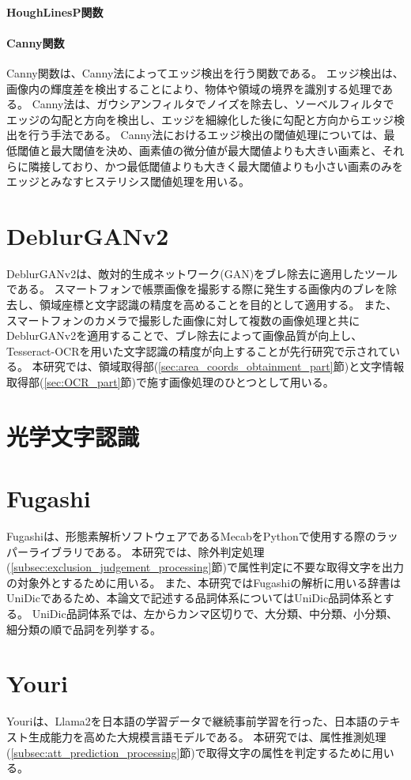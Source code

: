 \paragraph{HoughLinesP関数}

\paragraph{Canny関数}
Canny関数は、Canny法によってエッジ検出を行う関数である。
エッジ検出は、画像内の輝度差を検出することにより、物体や領域の境界を識別する処理である\cite{エッジ検出}。
Canny法は、ガウシアンフィルタでノイズを除去し、ソーベルフィルタでエッジの勾配と方向を検出し、エッジを細線化した後に勾配と方向からエッジ検出を行う手法である。
Canny法におけるエッジ検出の閾値処理については、最低閾値と最大閾値を決め、画素値の微分値が最大閾値よりも大きい画素と、それらに隣接しており、かつ最低閾値よりも大きく最大閾値よりも小さい画素のみをエッジとみなすヒステリシス閾値処理を用いる。


\section{DeblurGANv2}\label{sec:Deblur-GANv2}
DeblurGANv2は、敵対的生成ネットワーク(GAN)をブレ除去に適用したツールである\cite{DeblurGANv2}。
スマートフォンで帳票画像を撮影する際に発生する画像内のブレを除去し、領域座標と文字認識の精度を高めることを目的として適用する。
また、スマートフォンのカメラで撮影した画像に対して複数の画像処理と共にDeblurGANv2を適用することで、ブレ除去によって画像品質が向上し、Tesseract-OCRを用いた文字認識の精度が向上することが先行研究で示されている\cite{DeblurGANv2の先行研究}。
本研究では、領域取得部(\ref{sec:area_coords_obtainment_part}節)と文字情報取得部(\ref{sec:OCR_part}節)で施す画像処理のひとつとして用いる。


\section{光学文字認識}\label{sec:Optical-Charactor-Recognition}


\section{Fugashi}\label{sec:Fugashi}
Fugashiは、形態素解析ソフトウェアであるMecabをPythonで使用する際のラッパーライブラリである\cite{Fugashi}。
本研究では、除外判定処理(\ref{subsec:exclusion_judgement_processing}節)で属性判定に不要な取得文字を出力の対象外とするために用いる。
また、本研究ではFugashiの解析に用いる辞書はUniDicであるため、本論文で記述する品詞体系についてはUniDic品詞体系とする。
UniDic品詞体系では、左からカンマ区切りで、大分類、中分類、小分類、細分類の順で品詞を列挙する\cite{UniDic品詞体系}。


\section{Youri}\label{sec:Youri}
Youriは、Llama2を日本語の学習データで継続事前学習を行った、日本語のテキスト生成能力を高めた大規模言語モデルである\cite{Youri}。
本研究では、属性推測処理(\ref{subsec:att_prediction_processing}節)で取得文字の属性を判定するために用いる。